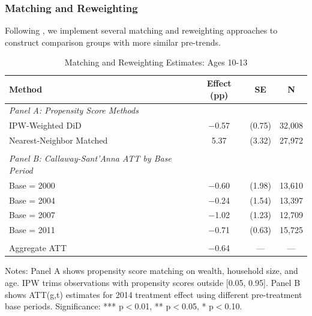 \documentclass[12pt]{article}
\begin{document}
\subsubsection{Matching and Reweighting}

Following \citet{CallawaySantanna2021}, we implement several matching and reweighting approaches to construct comparison groups with more similar pre-trends.

\begin{table}[H]
\centering
\caption{Matching and Reweighting Estimates: Ages 10-13}
\label{tab:matching}
\begin{threeparttable}
\begin{tabular}{lccc}
\toprule
Method & Effect (pp) & SE & N \\
\midrule
\textit{Panel A: Propensity Score Methods} & & & \\
\quad IPW-Weighted DiD & $-$0.57 & (0.75) & 32,008 \\
\quad Nearest-Neighbor Matched & 5.37 & (3.32) & 27,972 \\
\\
\textit{Panel B: Callaway-Sant'Anna ATT by Base Period} & & & \\
\quad Base = 2000 & $-$0.60 & (1.98) & 13,610 \\
\quad Base = 2004 & $-$0.24 & (1.54) & 13,397 \\
\quad Base = 2007 & $-$1.02 & (1.23) & 12,709 \\
\quad Base = 2011 & $-$0.71 & (0.63) & 15,725 \\
\\
\quad Aggregate ATT & $-$0.64 & --- & --- \\
\bottomrule
\end{tabular}
\begin{tablenotes}
\footnotesize
\item Notes: Panel A shows propensity score matching on wealth, household size, and age. IPW trims observations with propensity scores outside [0.05, 0.95]. Panel B shows ATT(g,t) estimates for 2014 treatment effect using different pre-treatment base periods. Significance: *** p$<$0.01, ** p$<$0.05, * p$<$0.10.
\end{tablenotes}
\end{threeparttable}
\end{table}
\end{document}
